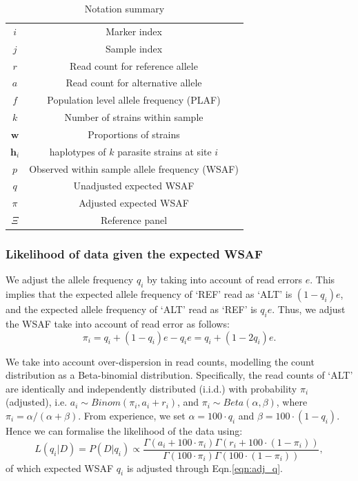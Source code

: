 \documentclass{bioinfo}
\begin{document}
\begin{table}[h]\centering
\begin{tabular}{c|c}\hline
$i$              & Marker index\\
$j$              & Sample index \\
$r$              & Read count for reference allele \\
$a$              & Read count for alternative allele \\
$f$              & Population level allele frequency (PLAF) \\
$k$              & Number of strains within sample \\
$\mathbf w$      & Proportions of strains \\
$\mathbf{h}_{i}$ & haplotypes of $k$ parasite strains at site $i$ \\
$p$              & Observed within sample allele frequency (WSAF) \\
$q$              & Unadjusted expected WSAF  \\
$\pi$            & Adjusted expected WSAF \\
$\Xi$            & Reference panel\\ \hline
\end{tabular}
\caption{Notation summary}\label{tab:notation}
\end{table}

\subsubsection{Likelihood of data given the expected WSAF}

We adjust the allele frequency $q_i$ by taking into account of read errors $e$. This implies that the expected allele frequency of `REF' read as `ALT' is $(1 - q_i)e$, and the expected allele frequency of `ALT' read as `REF' is $q_ie$. Thus, we adjust the WSAF take into account of read error as follows:
\begin{equation}
\pi_i = q_i + (1 - q_i)e - q_ie = q_i + (1 - 2q_i)e.\label{eqn:adj_q}
\end{equation}

We take into account over-dispersion in read counts, modelling the count distribution as a Beta-binomial distribution. Specifically, the read counts of `ALT' are identically and independently distributed (i.i.d.) with probability $\pi_{i}$ (adjusted), i.e. $a_i \sim Binom(\pi_{i}, a_i + r_i)$, and $\pi_{i}\sim Beta(\alpha, \beta)$, where $\pi_{i} = \alpha/(\alpha+\beta)$. From experience, we set $\alpha = 100\cdot q_{i} $ and $\beta = 100\cdot (1-q_{i})$. Hence we can formalise the likelihood of the data using:
\begin{equation}
L(q_{i} | D) = P(D|q_{i}) \propto \frac{\Gamma(a_i + 100\cdot \pi_{i}) \Gamma(r_i + 100\cdot (1-\pi_{i}))}{\Gamma(100\cdot \pi_{i})\Gamma(100\cdot (1-\pi_{i}))}, \label{eqn:llk}
\end{equation}
of which expected WSAF $q_i$ is adjusted through Eqn.\eqref{eqn:adj_q}.
\end{document}
